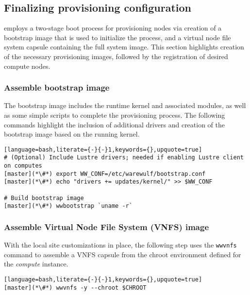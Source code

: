 \subsection{Finalizing provisioning configuration} \label{sec:assemble_bootstrap}

\Warewulf{} employs a two-stage boot process for provisioning nodes via
creation of a bootstrap image that is used to initialize the process, and a virtual node
file system capsule containing the full system image. This section highlights
creation of the necessary provisioning images, followed by the registration of
desired compute nodes.

\subsubsection{Assemble bootstrap image}

The bootstrap image includes the runtime kernel and associated modules, as well
as some simple scripts to complete the provisioning process. The
following commands highlight the inclusion of additional drivers and creation
of the bootstrap image based on the running kernel.

\begin{lstlisting}[language=bash,literate={-}{-}1,keywords={},upquote=true]
# (Optional) Include Lustre drivers; needed if enabling Lustre client on computes
[master](*\#*) export WW_CONF=/etc/warewulf/bootstrap.conf
[master](*\#*) echo "drivers += updates/kernel/" >> $WW_CONF

# Build bootstrap image
[master](*\#*) wwbootstrap `uname -r`
\end{lstlisting}

\subsubsection{Assemble Virtual Node File System (VNFS) image}

With the local site customizations in place, the following step uses the
\texttt{wwvnfs} command to assemble a VNFS capsule from the chroot environment
defined for the {\em compute} instance. 

\begin{lstlisting}[language=bash,literate={-}{-}1,keywords={},upquote=true]
[master](*\#*) wwvnfs -y --chroot $CHROOT
\end{lstlisting}

